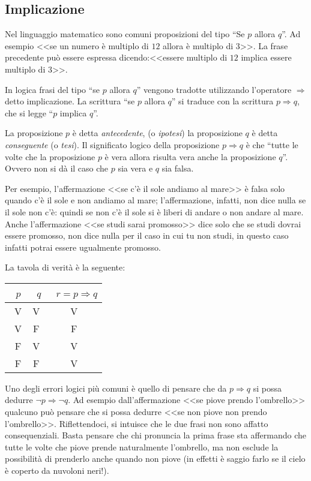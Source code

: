 {\subsection{Implicazione}

Nel linguaggio matematico sono comuni proposizioni del tipo “Se $ p $ allora $ q $”. Ad esempio <<se un numero è multiplo di $ 12 $ allora è multiplo di $ 3 $>>. La frase precedente può essere espressa dicendo:<<essere multiplo di $ 12 $ implica essere multiplo di $ 3 $>>.

In logica frasi del tipo “se $ p $ allora $ q $” vengono tradotte utilizzando l'operatore $\Rightarrow $ detto implicazione.
La scrittura “se $ p $ allora $ q $” si traduce con la scrittura  $p\Rightarrow q$, che si legge “$ p $ implica $ q $”.

La proposizione $ p $ è detta \emph{antecedente}, (o \emph{ipotesi}) la proposizione $ q $ è detta \emph{conseguente} (o \emph{tesi}).
Il significato logico della proposizione  $p\Rightarrow q$  è che “tutte le volte che la proposizione $ p $ è vera allora risulta vera anche la proposizione $ q $”. Ovvero non si dà il caso che $ p $ sia vera e $ q $ sia falsa.

Per esempio, l'affermazione <<se c'è il sole andiamo al mare>> è falsa solo quando c'è il sole e non andiamo al mare; l'affermazione, infatti, non dice nulla se il sole non c'è: quindi se non c'è il sole si è liberi di andare o non andare al mare. Anche l'affermazione <<se studi sarai promosso>> dice solo che se studi dovrai essere promosso, non dice nulla per il caso in cui tu non studi, in questo caso infatti potrai essere ugualmente promosso.

La tavola di verità è la seguente:
\begin{center}
 \begin{tabular*}{.3 \textwidth}{@{\extracolsep{\fill}}*{3}{c}}
 \toprule
~$p$ &~$q$ &~$r=p\Rightarrow q$\\
\midrule
~V & V & V \\
~V & F & F \\
~F & V & V \\
~F & F & V \\
\bottomrule
 \end{tabular*}
\end{center}

Uno degli errori logici più comuni è quello di pensare che da  $p\Rightarrow q$  si possa dedurre  $\neg p\Rightarrow \neg q$.
Ad esempio dall'affermazione <<se piove prendo l'ombrello>> qualcuno può pensare che si possa dedurre <<se non piove non prendo l'ombrello>>. Riflettendoci, si intuisce che le due frasi non sono affatto consequenziali. Basta pensare che chi pronuncia la prima frase sta affermando che tutte le volte che piove prende naturalmente l'ombrello, ma non esclude la possibilità di prenderlo anche quando non piove (in effetti è saggio farlo se il cielo è coperto da nuvoloni neri!).

}
